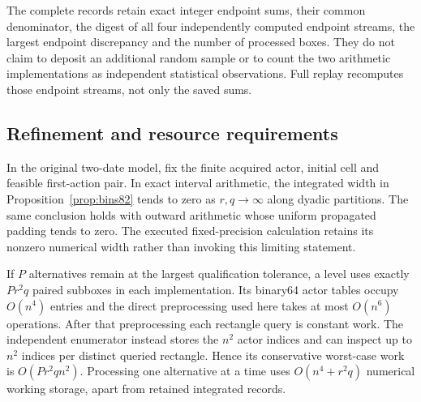 The complete records retain exact integer endpoint sums, their common denominator, the digest of all four independently computed endpoint streams, the largest endpoint discrepancy and the number of processed boxes. They do not claim to deposit an additional random sample or to count the two arithmetic implementations as independent statistical observations. Full replay recomputes those endpoint streams, not only the saved sums.

\subsection{Refinement and resource requirements}
\begin{proposition}\label{prop:refinement82}
In the original two-date model, fix the finite acquired actor, initial cell and feasible first-action pair. In exact interval arithmetic, the integrated width in Proposition~\ref{prop:bins82} tends to zero as $r,q\to\infty$ along dyadic partitions. The same conclusion holds with outward arithmetic whose uniform propagated padding tends to zero. The executed fixed-precision calculation retains its nonzero numerical width rather than invoking this limiting statement.

If $P$ alternatives remain at the largest qualification tolerance, a level uses exactly $Pr^2q$ paired subboxes in each implementation. Its binary64 actor tables occupy $O(n^4)$ entries and the direct preprocessing used here takes at most $O(n^6)$ operations. After that preprocessing each rectangle query is constant work. The independent enumerator instead stores the $n^2$ actor indices and can inspect up to $n^2$ indices per distinct queried rectangle. Hence its conservative worst-case work is $O(Pr^2qn^2)$. Processing one alternative at a time uses $O(n^4+r^2q)$ numerical working storage, apart from retained integrated records.
\end{proposition}

